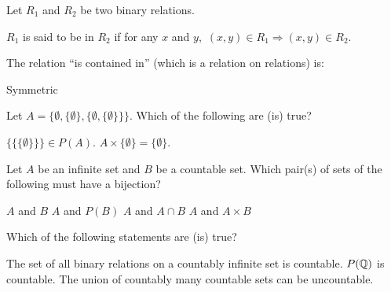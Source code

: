 \begin{questions}

\question Let $R_1$ and $R_2$ be two binary relations. 

$R_1$ is said to be  in $R_2$ if for any $x$ and $y$, $\, (x,y)\in R_1 \Rightarrow (x,y)\in R_2$. 

The relation ``is contained in'' (which is a relation on relations)
is:
\begin{choices}
\choice {}
\choice Symmetric
\choice {}
\end{choices}

\vspace{1.8in}

\question Let $A = \Big\{\emptyset,\{\emptyset\},\big\{\emptyset,\{\emptyset\} \big\} \Big\}$. Which of the following are (is) true?
\begin{choices}
\choice $\Big\{\big\{\{\emptyset\}\big\}\Big\} \in P(A)$.
\choice $A \times \{\emptyset\} = \{{\emptyset}\}$.
\choice {}
\end{choices}
\vspace{0.2in}


\newpage

\question Let $A$ be an infinite set and $B$ be a countable set. Which pair(s) of sets of the following must have a bijection?
\begin{choices}
\choice $A$ and $B$
\choice $A$ and $P(B)$
\choice $A$ and $A \cap B$
\choice {}
\choice $A$ and $A \times B$
\end{choices}
\vspace{0.2in}

\vspace{1.8in}


\question Which of the following statements are (is) true?
\begin{choices}
\choice {}
\choice The set of all binary relations on a countably infinite set is countable.
\choice $P({\mathbb Q}{})$ is countable.
\choice The union of countably many countable sets can be uncountable.
\choice {}
\end{choices}

\end{questions}
